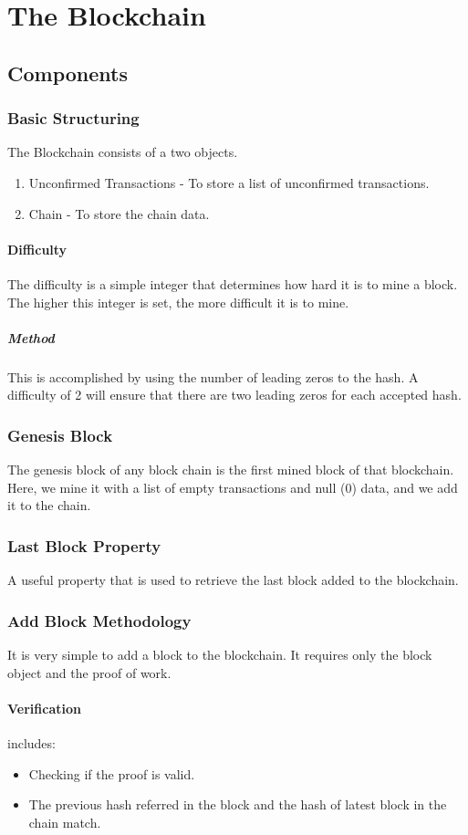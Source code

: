 \documentclass{article}
\begin{document}
\section{The Blockchain}
\subsection{Components}
\subsubsection{Basic Structuring}
The Blockchain consists of a two objects. 
\begin{enumerate}
	\item Unconfirmed Transactions - To store a list of unconfirmed transactions.
	\item Chain - To store the chain data.
\end{enumerate}
\paragraph{Difficulty}
The difficulty is a simple integer that determines how hard it is to mine a block. The higher this integer is set, the more difficult it is to mine. 

\subparagraph{Method}
This is accomplished by using the number of leading zeros to the hash. A difficulty of 2 will ensure that there are two leading zeros for each accepted hash.
\subsubsection{Genesis Block}
The genesis block of any block chain is the first mined block of that blockchain. Here, we mine it with a list of empty transactions and null (0) data, and we add it to the chain.
\subsubsection{Last Block Property}
A useful property that is used to retrieve the last block added to the blockchain.
\subsubsection{Add Block Methodology}
It is very simple to add a block to the blockchain. It requires only the block object and the proof of work.
\paragraph{Verification}
includes: 
\begin{itemize}
	\item Checking if the proof is valid.
	\item The previous hash referred in the block and the hash of latest block in the chain match.
\end{itemize}
\end{document}
